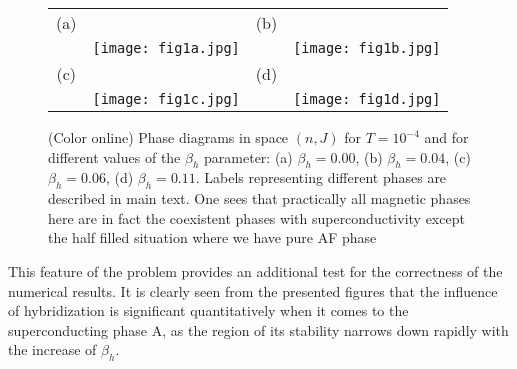 \documentclass[aps,prb,showpacs,reprint]{revtex4-1}
\begin{document}
\begin{figure}[h]
\centering
\begin{tabular}{cccc}
 (a) & & \quad \quad \quad  (b) & \\
  &\texttt{[image: fig1a.jpg]} & &
\texttt{[image: fig1b.jpg]}\quad \quad \quad \quad
 \\
 (c) & & \quad \quad \quad (d) & \\
  &\texttt{[image: fig1c.jpg]} & &  
\texttt{[image: fig1d.jpg]}\quad \quad \quad
\quad 
\end{tabular}
\caption{(Color online) Phase diagrams in space $(n,J)$ for $T=10^{-4}$ and for
different values of the $\beta_h$
parameter: (a) $\beta_h=0.00$, (b) $\beta_h=0.04$, (c) $\beta_h=0.06$, (d)
$\beta_h=0.11$. Labels representing different phases are described in main
text. One sees that practically all magnetic phases here are in fact the
coexistent phases with superconductivity except the half filled situation where
we have pure AF phase}
\label{fig:diag_all}
\end{figure}
\twocolumngrid
\noindent This feature of the problem provides an additional test for the correctness of the numerical results. It is clearly seen from the presented
figures that the influence of hybridization is significant quantitatively when it comes to the
superconducting phase A, as the region of its stability narrows down rapidly
with the increase of $\beta_h$.
\end{document}

